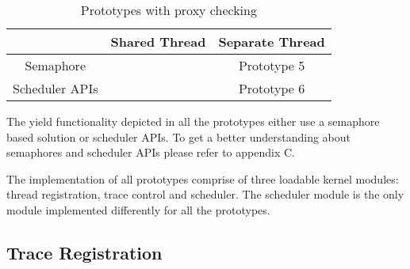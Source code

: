 \begin{table}[h]
\begin{center}
 \begin{tabular}{|c c c|} 
 \hline
 & Shared Thread & Separate Thread\\ %
 \hline
Semaphore &  & Prototype 5\\
Scheduler APIs &  & Prototype 6\\
\hline
\end{tabular}
\end{center}
\caption{Prototypes with proxy checking}
\label{protos_with_proxy}
\end{table}

The yield functionality depicted in all the prototypes either use a semaphore based solution or scheduler APIs. To get a better understanding about semaphores and scheduler APIs please refer to appendix C.

The implementation of all prototypes comprise of three loadable kernel modules: thread registration, trace control and scheduler. 
The scheduler module is the only module implemented differently for all the prototypes.

\subsection{Trace Registration}

